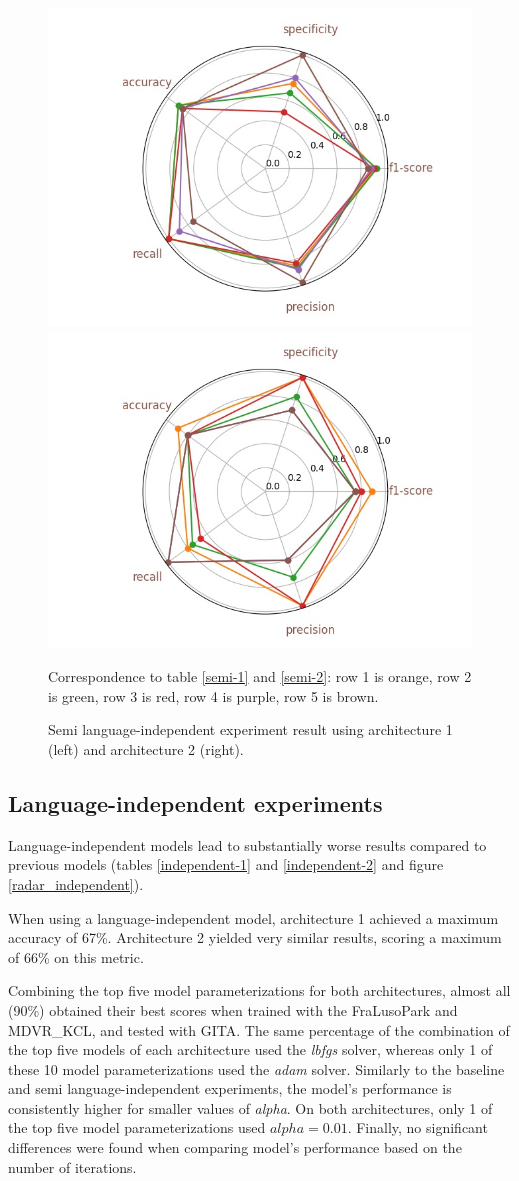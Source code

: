 \begin{figure}[t]
	\begin{center}
		\includegraphics[width=.49\linewidth]{figs/semi_radar.jpg}
		\includegraphics[width=.49\linewidth]{figs/semi_200_radar.jpg}
	\end{center}
	\caption{Semi language-independent experiment result using architecture 1 (left) and architecture 2 (right).} Correspondence to table \ref{semi-1} and \ref{semi-2}: row 1 is orange, row 2 is green, row 3 is red, row 4 is purple, row 5 is brown.
	\label{radar_semi}
\end{figure}

\subsection{Language-independent experiments}

Language-independent models lead to substantially worse results compared to previous models (tables \ref{independent-1} and \ref{independent-2} and figure \ref{radar_independent}).

When using a language-independent model, architecture 1 achieved a maximum accuracy of 67\%. Architecture 2 yielded very similar results, scoring a maximum of 66\% on this metric.

Combining the top five model parameterizations for both architectures, almost all (90\%) obtained their best scores when trained with the FraLusoPark and MDVR\_KCL, and tested with GITA. The same percentage of the combination of the top five models of each architecture used the \textit{lbfgs} solver, whereas only 1 of these 10 model parameterizations used the \textit{adam} solver. Similarly to the baseline and semi language-independent experiments, the model's performance is consistently higher for smaller values of \textit{alpha}. On both architectures, only 1 of the top five model parameterizations used $alpha = 0.01$. Finally, no significant differences were found when comparing model's performance based on the number of iterations.

